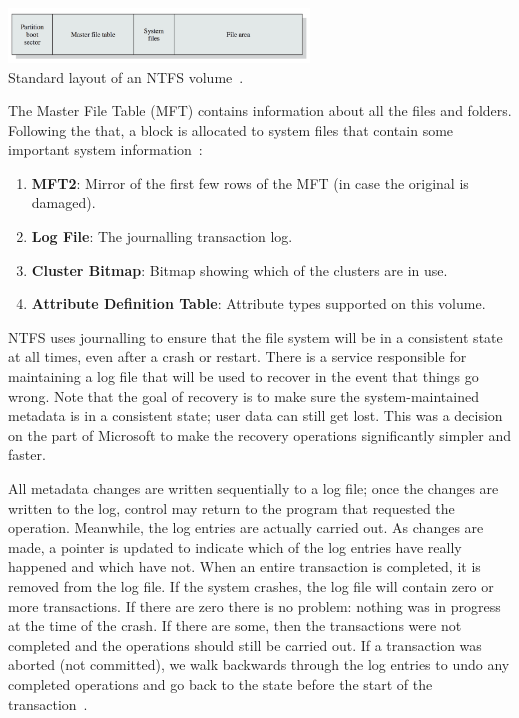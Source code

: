 \begin{center}
	\includegraphics[width=0.6\textwidth]{images/ntfs-volume.png}\\
	Standard layout of an NTFS volume~\cite{osi}.
\end{center}

The Master File Table (MFT) contains information about all the files and folders. Following the that, a block is allocated to system files that contain some important system information~\cite{osi}:

\begin{enumerate}
	\item \textbf{MFT2}: Mirror of the first few rows of the MFT (in case the original is damaged).
	\item \textbf{Log File}: The journalling transaction log.
	\item \textbf{Cluster Bitmap}: Bitmap showing which of the clusters are in use.
	\item \textbf{Attribute Definition Table}: Attribute types supported on this volume.
\end{enumerate}

NTFS uses journalling to ensure that the file system will be in a consistent state at all times, even after a crash or restart. There is a service responsible for maintaining a log file that will be used to recover in the event that things go wrong.  Note that the goal of recovery is to make sure the system-maintained metadata is in a consistent state; user data can still get lost. This was a decision on the part of Microsoft to make the recovery operations significantly simpler and faster.

All metadata changes are written sequentially to a log file; once the changes are written to the log, control may return to the program that requested the operation. Meanwhile, the log entries are actually carried out. As changes are made, a pointer is updated to indicate which of the log entries have really happened and which have not. When an entire transaction is completed, it is removed from the log file. If the system crashes, the log file will contain zero or more transactions. If there are zero there is no problem: nothing was in progress at the time of the crash. If there are some, then the transactions were not completed and the operations should still be carried out. If a transaction was aborted (not committed), we walk backwards through the log entries to undo any completed operations and go back to the state before the start of the transaction~\cite{osc}.

